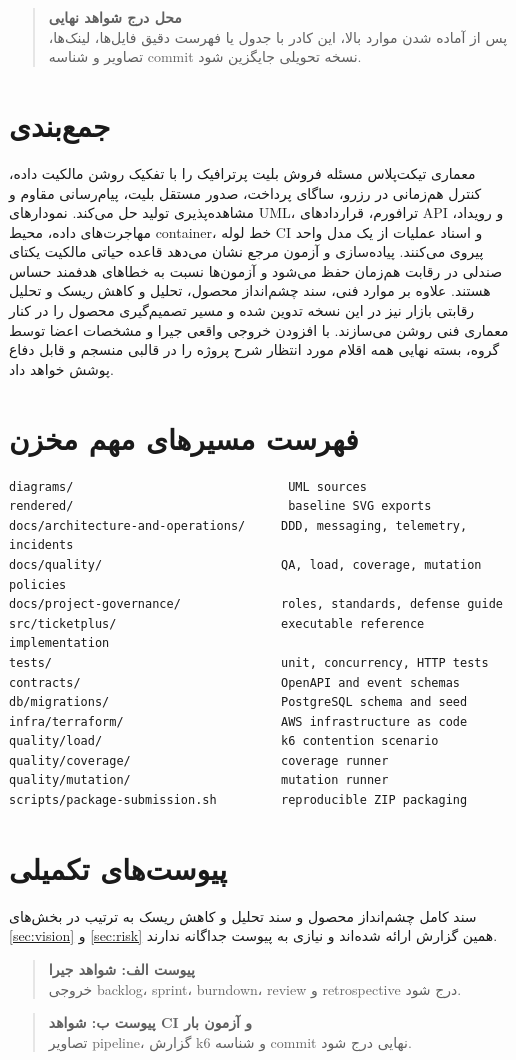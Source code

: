 \documentclass[12pt,a4paper]{article}
\newcommand{\reservedbox}[2]{%
    \begin{quote}
    \textbf{#1}\\[0.3em]
    #2
    \end{quote}
}
\begin{document}
\reservedbox{محل درج شواهد نهایی}{پس از آماده شدن موارد بالا، این کادر با
جدول یا فهرست دقیق فایل‌ها، لینک‌ها، تصاویر و شناسه commit نسخه تحویلی جایگزین
شود.}

\section{جمع‌بندی}

معماری تیکت‌پلاس مسئله فروش بلیت پرترافیک را با تفکیک روشن مالکیت داده، کنترل
هم‌زمانی در رزرو، ساگای پرداخت، صدور مستقل بلیت، پیام‌رسانی مقاوم و مشاهده‌پذیری
تولید حل می‌کند. نمودارهای UML، ترافورم، قراردادهای API و رویداد، مهاجرت‌های
داده، محیط container، خط لوله CI و اسناد عملیات از یک مدل واحد پیروی می‌کنند.
پیاده‌سازی و آزمون مرجع نشان می‌دهد قاعده حیاتی مالکیت یکتای صندلی در رقابت
هم‌زمان حفظ می‌شود و آزمون‌ها نسبت به خطاهای هدفمند حساس هستند. علاوه بر
موارد فنی، سند چشم‌انداز محصول، تحلیل و کاهش ریسک و تحلیل رقابتی بازار نیز در
این نسخه تدوین شده و مسیر تصمیم‌گیری محصول را در کنار معماری فنی روشن
می‌سازند. با افزودن خروجی واقعی جیرا و مشخصات اعضا توسط گروه، بسته نهایی همه
اقلام مورد انتظار شرح پروژه را در قالبی منسجم و قابل دفاع پوشش خواهد داد.


\section{فهرست مسیرهای مهم مخزن}
\begin{latin}
\begin{lstlisting}
diagrams/                              UML sources
rendered/                              baseline SVG exports
docs/architecture-and-operations/     DDD, messaging, telemetry, incidents
docs/quality/                         QA, load, coverage, mutation policies
docs/project-governance/              roles, standards, defense guide
src/ticketplus/                       executable reference implementation
tests/                                unit, concurrency, HTTP tests
contracts/                            OpenAPI and event schemas
db/migrations/                        PostgreSQL schema and seed
infra/terraform/                      AWS infrastructure as code
quality/load/                         k6 contention scenario
quality/coverage/                     coverage runner
quality/mutation/                     mutation runner
scripts/package-submission.sh         reproducible ZIP packaging
\end{lstlisting}
\end{latin}

\section{پیوست‌های تکمیلی}
سند کامل چشم‌انداز محصول و سند تحلیل و کاهش ریسک به ترتیب در بخش‌های
\ref{sec:vision} و \ref{sec:risk} همین گزارش ارائه شده‌اند و نیازی به پیوست
جداگانه ندارند.

\reservedbox{پیوست الف: شواهد جیرا}{خروجی backlog، sprint، burndown، review و
retrospective درج شود.}
\reservedbox{پیوست ب: شواهد CI و آزمون بار}{تصاویر pipeline، گزارش k6 و شناسه
commit نهایی درج شود.}
\end{document}
